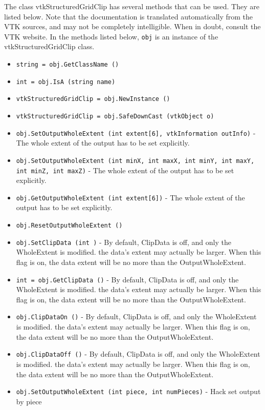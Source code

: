 The class vtkStructuredGridClip has several methods that can be used.
  They are listed below.
Note that the documentation is translated automatically from the VTK sources,
and may not be completely intelligible.  When in doubt, consult the VTK website.
In the methods listed below, \verb|obj| is an instance of the vtkStructuredGridClip class.
\begin{itemize}
\item  \verb|string = obj.GetClassName ()|

\item  \verb|int = obj.IsA (string name)|

\item  \verb|vtkStructuredGridClip = obj.NewInstance ()|

\item  \verb|vtkStructuredGridClip = obj.SafeDownCast (vtkObject o)|

\item  \verb|obj.SetOutputWholeExtent (int extent[6], vtkInformation outInfo)| -  The whole extent of the output has to be set explicitly.

\item  \verb|obj.SetOutputWholeExtent (int minX, int maxX, int minY, int maxY, int minZ, int maxZ)| -  The whole extent of the output has to be set explicitly.

\item  \verb|obj.GetOutputWholeExtent (int extent[6])| -  The whole extent of the output has to be set explicitly.

\item  \verb|obj.ResetOutputWholeExtent ()|

\item  \verb|obj.SetClipData (int )| -  By default, ClipData is off, and only the WholeExtent is modified.
 the data's extent may actually be larger.  When this flag is on,
 the data extent will be no more than the OutputWholeExtent.

\item  \verb|int = obj.GetClipData ()| -  By default, ClipData is off, and only the WholeExtent is modified.
 the data's extent may actually be larger.  When this flag is on,
 the data extent will be no more than the OutputWholeExtent.

\item  \verb|obj.ClipDataOn ()| -  By default, ClipData is off, and only the WholeExtent is modified.
 the data's extent may actually be larger.  When this flag is on,
 the data extent will be no more than the OutputWholeExtent.

\item  \verb|obj.ClipDataOff ()| -  By default, ClipData is off, and only the WholeExtent is modified.
 the data's extent may actually be larger.  When this flag is on,
 the data extent will be no more than the OutputWholeExtent.

\item  \verb|obj.SetOutputWholeExtent (int piece, int numPieces)| -  Hack set output by piece

\end{itemize}
